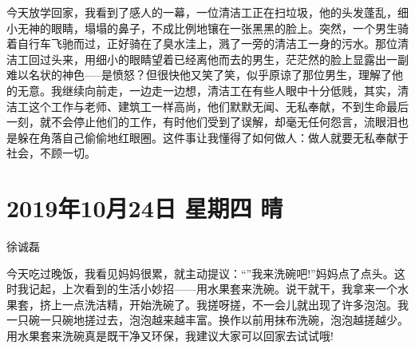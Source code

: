 今天放学回家，我看到了感人的一幕，一位清洁工正在扫垃圾，他的头发蓬乱，细小无神的眼睛，塌塌的鼻子，不成比例地镶在一张黑黑的脸上。突然，一个男生骑着自行车飞驰而过，正好骑在了臭水洼上，溅了一旁的清洁工一身的污水。那位清洁工回过头来，用细小的眼睛望着已经离他而去的男生，茫茫然的脸上显露出一副难以名状的神色-----是愤怒？但很快他又笑了笑，似乎原谅了那位男生，理解了他的无意。我继续向前走，一边走一边想，清洁工在有些人眼中十分低贱，其实，清洁工这个工作与老师、建筑工一样高尚，他们默默无闻、无私奉献，不到生命最后一刻，就不会停止他们的工作，有时他们受到了误解，却毫无任何怨言，流眼泪也是躲在角落自己偷偷地红眼圈。这件事让我懂得了如何做人：做人就要无私奉献于社会，不顾一切。

\section{2019年10月24日 星期四 晴}

徐诚磊

今天吃过晚饭，我看见妈妈很累，就主动提议：``''我来洗碗吧!''妈妈点了点头。这时我记起，上次看到的生活小妙招------用水果套来洗碗。说干就干，我拿来一个水果套，挤上一点洗洁精，开始洗碗了。我搓呀搓，不一会儿就出现了许多泡泡。我一只碗一只碗地搓过去，泡泡越来越丰富。换作以前用抹布洗碗，泡泡越搓越少。用水果套来洗碗真是既干净又环保，我建议大家可以回家去试试哦!
